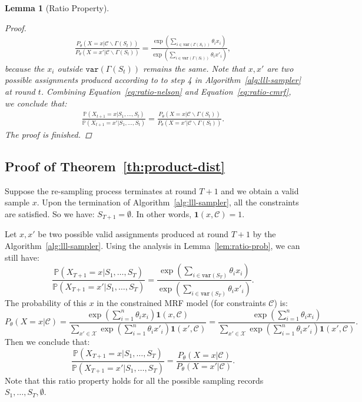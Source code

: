 \documentclass[letterpaper]{article} %
\newtheorem{lemma}{Lemma}
\newcommand{\var}{\mathtt{var}}
\newcommand{\p}{\mathbb{P}}
\begin{document}
\begin{lemma}[Ratio Property]
\begin{proof}
\begin{equation}
\begin{aligned}
\frac{P_{\theta}(X=x|\mathcal{C}\backslash \Gamma(S_t))}{P_{\theta}(X=x'|\mathcal{C}\backslash\Gamma(S_t))}=\frac{\exp(\sum_{i\in \var(\Gamma(S_t))}\theta_ix_i)}{\exp(\sum_{i\in \var(\Gamma(S_t))}\theta_ix'_i)},
\end{aligned}
\end{equation}
because the $x_i$ outside $\var(\Gamma(S_t))$ remains the same. Note that $x,x'$ are two possible assignments produced according to to step 4 in Algorithm~\ref{alg:lll-sampler} at round $t$. 
Combining Equation~\eqref{eq:ratio-nelson} and Equation~\eqref{eq:ratio-cmrf}, we conclude that:
\begin{equation*}
\begin{aligned}
\frac{\p(X_{t+1}=x|S_1,\ldots,S_t)}{\p(X_{t+1}=x'|S_1,\ldots,S_t)}=\frac{P_{\theta}(X=x|\mathcal{C}\backslash \Gamma(S_t))}{P_{\theta}(X=x'|\mathcal{C}\backslash\Gamma(S_t))}.
\end{aligned}
\end{equation*}
The proof is finished. 
\end{proof}
\end{lemma}

\subsection{Proof of Theorem~\ref{th:product-dist}}
Suppose the re-sampling process terminates at round $T+1$ and we obtain a valid sample $x$. Upon the termination of Algorithm~\ref{alg:lll-sampler}, all the constraints are satisfied. So we have: $S_{T+1}=\emptyset$. In other words, $\mathbf{1}(x,\mathcal{C})=1$. 

Let $x,x'$ be two possible valid assignments produced at round $T+1$ by the Algorithm~\ref{alg:lll-sampler}. Using the analysis in Lemma~\ref{lem:ratio-prob}, we can still have:
\begin{equation*}
\frac{\p(X_{T+1}=x|S_1,\ldots, S_T)}{\p(X_{T+1}=x'|S_1,\ldots, S_T)}=\frac{\exp(\sum_{i\in\var(S_T)}\theta_ix_i)}{\exp(\sum_{i\in\var(S_T)}\theta_ix'_i)}.
\end{equation*}
The probability of this $x$ in the constrained MRF model  (for constraints  $\mathcal{C}$) is:
\begin{equation*}
P_{\theta}(X=x|\mathcal{C})=\frac{\exp(\sum_{i=1}^n\theta_i x_i)\mathbf{1}(x,\mathcal{C})}{\sum_{x'\in\mathcal{X}}  \exp(\sum_{i=1}^n\theta_i x'_i)\mathbf{1}\left(x',\mathcal{C}\right)}
=\frac{\exp(\sum_{i=1}^n\theta_i x_i)}{\sum_{x'\in\mathcal{X}}  \exp(\sum_{i=1}^n\theta_i x'_i)\mathbf{1}\left(x',\mathcal{C}\right)}.
\end{equation*}
Then we conclude that:
\begin{equation*}
\frac{\p(X_{T+1}=x|S_1,\ldots, S_T)}{\p(X_{T+1}=x'|S_1,\ldots, S_T)}=\frac{P_{\theta}(X=x|\mathcal{C})}{P_{\theta}(X=x'|\mathcal{C})}.
\end{equation*}
Note that this ratio property holds for all the possible sampling records $S_1,\ldots, S_T,\emptyset$.
\end{document}
